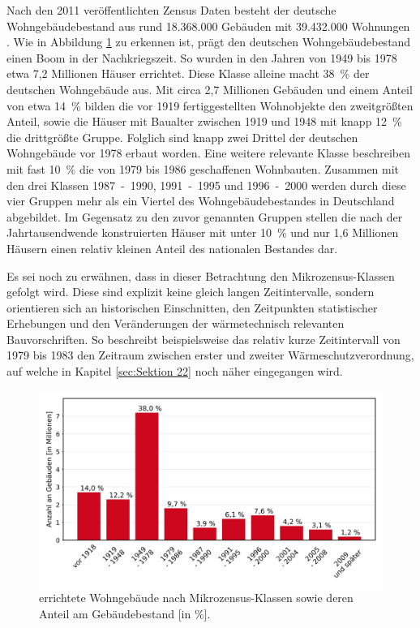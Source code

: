 Nach den 2011 veröffentlichten Zensus Daten besteht der deutsche Wohngebäudebestand aus rund 18.368.000 Gebäuden mit 39.432.000 Wohnungen \cite{.2015}.
Wie in Abbildung \ref{fig: Abbildung211} zu erkennen ist, prägt den deutschen Wohngebäudebestand einen Boom in der Nachkriegszeit. 
So wurden in den Jahren von 1949 bis 1978 etwa 7,2 Millionen Häuser errichtet. Diese Klasse alleine macht \mbox{38 \%} der deutschen Wohngebäude aus. 
Mit circa 2,7 Millionen Gebäuden und einem Anteil von etwa \mbox{14 \%} bilden die vor 1919 fertiggestellten Wohnobjekte den zweitgrößten Anteil, sowie die Häuser mit Baualter zwischen 1919 und 1948 mit knapp \mbox{12 \%} die drittgrößte Gruppe.
Folglich sind knapp zwei Drittel der deutschen Wohngebäude vor 1978 erbaut worden.
Eine weitere relevante Klasse beschreiben mit fast \mbox{10 \%} die von 1979 bis 1986 geschaffenen Wohnbauten. 
Zusammen mit den drei Klassen \mbox{1987 - 1990,} \mbox{1991 - 1995} und \mbox{1996 - 2000} werden  durch diese vier Gruppen mehr als ein Viertel des Wohngebäudebestandes in Deutschland abgebildet.
Im Gegensatz zu den zuvor genannten Gruppen stellen die nach der Jahrtausendwende konstruierten Häuser mit unter \mbox{10 \%} und nur 1,6 Millionen Häusern einen relativ kleinen Anteil des nationalen Bestandes dar. 

Es sei noch zu erwähnen, dass in dieser Betrachtung den Mikrozensus-Klassen gefolgt wird. 
Diese sind explizit keine gleich langen Zeitintervalle, sondern \glqq orientieren sich an historischen Einschnitten, den Zeitpunkten statistischer Erhebungen und den Veränderungen der wärmetechnisch relevanten Bauvorschriften\grqq \cite{.2015}. 
So beschreibt beispielsweise das relativ kurze Zeitintervall von 1979 bis 1983 den Zeitraum zwischen erster und zweiter Wärmeschutzverordnung, auf welche in Kapitel \ref{sec:Sektion 22} noch näher eingegangen wird.

\begin{figure}[H]
	\centering
		\includegraphics{Pictures/GebaeudeAlterDiagramm.jpg}
	\caption{errichtete Wohngebäude nach Mikrozensus-Klassen sowie deren Anteil am Gebäudebestand [in \%].\cite{StatistischeAmterdesBundesundderLander.2014}}
	\label{fig: Abbildung211} 
\end{figure}


